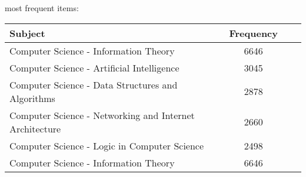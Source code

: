 \tiny most frequent items:
	\begin{tabular}{lccc}
		\tiny \textbf{Subject} &\tiny \textbf{Frequency}\\
		\hline
		\tiny Computer Science - Information Theory & \tiny 6646 \\
		\tiny Computer Science - Artificial Intelligence & \tiny 3045 \\
		\tiny Computer Science - Data Structures and Algorithms & \tiny 2878 \\
		\tiny Computer Science - Networking and Internet Architecture & \tiny 2660 \\
		\tiny Computer Science - Logic in Computer Science & \tiny 2498 \\
		\tiny Computer Science - Information Theory & \tiny 6646 \\
	\end{tabular}
